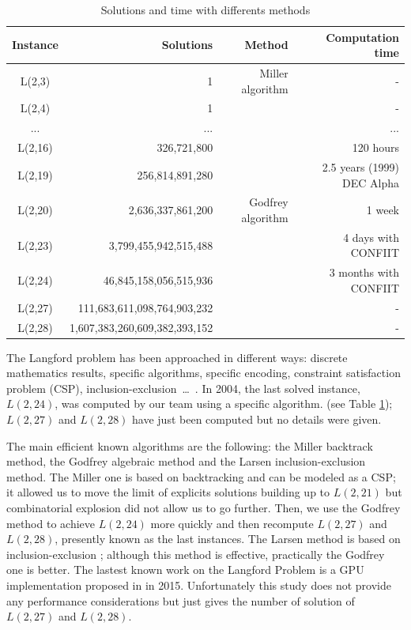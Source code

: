 \begin{table}[t!]
\centering
\begin{tabular}{c r r r}
  \hline
  Instance & Solutions & Method & Computation time\\
  \hline
  \hline
  L(2,3) & 1 &  Miller algorithm & - \\
  L(2,4) & 1 & & - \\ 
  ... & ... & & ...  \\
  L(2,16) & 326,721,800 & & 120 hours  \\
  L(2,19) & 256,814,891,280 & & 2.5 years (1999) DEC Alpha \\
  \hline
  \hline
  L(2,20) & 2,636,337,861,200 & Godfrey algorithm & 1 week \\
  L(2,23) & 3,799,455,942,515,488 & &  4 days with CONFIIT \\
  L(2,24) & 46,845,158,056,515,936 & & 3 months with CONFIIT \\
  L(2,27) & 111,683,611,098,764,903,232 & & - \\
  L(2,28) & 1,607,383,260,609,382,393,152 & & - \\
  \hline
\end{tabular}

\caption{Solutions and time with differents methods}
\label{tab:result_base}

\end{table}

The Langford problem has been approached in different ways: discrete mathematics results, specific algorithms, specific encoding, constraint satisfaction problem (CSP), inclusion-exclusion~\ldots~\cite{Mil00,apes-26,Smi00,larsen2009counting}.
In 2004, the last solved instance, $L(2,24)$, was computed by our team using a specific algorithm. (see Table \ref{tab:result_base}); $L(2,27)$ and $L(2,28)$ have just been computed but no details were given. 

The main efficient known algorithms are the following: the Miller backtrack method, the Godfrey algebraic method and the Larsen inclusion-exclusion method.
The Miller one is based on backtracking and can be modeled as a CSP; it allowed us to move the limit of explicits solutions building up to $L(2,21)$ but combinatorial explosion did not allow us to go further. 
Then, we use the Godfrey method to achieve $L(2,24)$ more quickly and then recompute $L(2,27)$ and $L(2,28)$, presently known as the last instances.
The Larsen method is based on inclusion-exclusion \cite{larsen2009counting}; although this method is effective, practically the Godfrey one is better. 
The lastest known work on the Langford Problem is a GPU implementation proposed in \cite{ASS_LGF} in 2015. Unfortunately this study does not provide any performance considerations but just gives the number of solution of $L(2,27)$ and $L(2,28)$.

